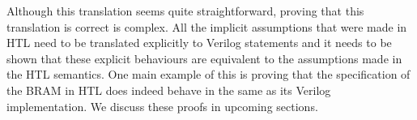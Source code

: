 Although this translation seems quite straight\-forward, proving that this translation is correct is complex.
All the implicit assumptions that were made in HTL need to be translated explicitly to Verilog statements and it needs to be shown that these explicit behaviours are equivalent to the assumptions made in the HTL semantics.  One main example of this is proving that the specification of the \gls{BRAM} in HTL does indeed behave in the same as its Verilog implementation.
We discuss these proofs in upcoming sections.


